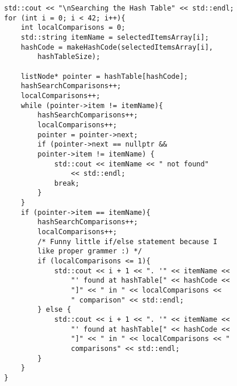 \documentclass{article}
\begin{document}
\begin{lstlisting}
std::cout << "\nSearching the Hash Table" << std::endl;
for (int i = 0; i < 42; i++){
    int localComparisons = 0;
    std::string itemName = selectedItemsArray[i];
    hashCode = makeHashCode(selectedItemsArray[i],
        hashTableSize);

    listNode* pointer = hashTable[hashCode];
    hashSearchComparisons++;
    localComparisons++;
    while (pointer->item != itemName){
        hashSearchComparisons++;
        localComparisons++;
        pointer = pointer->next;
        if (pointer->next == nullptr && 
        pointer->item != itemName) {
            std::cout << itemName << " not found" 
                << std::endl;
            break;
        }
    }
    if (pointer->item == itemName){
        hashSearchComparisons++;
        localComparisons++;
        /* Funny little if/else statement because I 
        like proper grammer :) */
        if (localComparisons <= 1){
            std::cout << i + 1 << ". '" << itemName << 
                "' found at hashTable[" << hashCode << 
                "]" << " in " << localComparisons << 
                " comparison" << std::endl;
        } else {
            std::cout << i + 1 << ". '" << itemName << 
                "' found at hashTable[" << hashCode << 
                "]" << " in " << localComparisons << " 
                comparisons" << std::endl;
        }
    }
}
\end{lstlisting}
\end{document}
